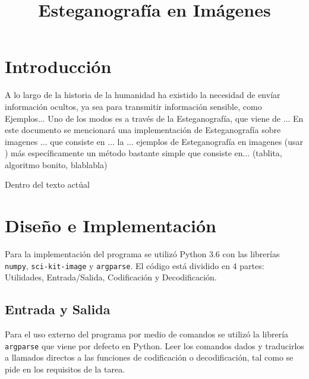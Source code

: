 \documentclass[conference]{IEEEtran}
\begin{document}
\title{Esteganografía en Imágenes}
\author{
}


\maketitle

\begin{abstract}

\end{abstract}

\section*{Introducción} %
    A lo largo de la historia de la humanidad ha existido la necesidad de envíar información ocultos, ya sea para transmitir información sensible, como  Ejemplos...
    Uno de los modos es a través de la Esteganografía, que viene de ...
    En este documento se mencionará una implementación de Esteganografía sobre imagenes ... que consiste en ... la
    ... ejemplos de Esteganografía en imagenes (usar \cite{DIS})
    más específicamente un método bastante simple que consiste en...
    (tablita, algoritmo bonito, blablabla)

    Dentro del texto actúal     
    
\section*{Diseño e Implementación}
	Para la implementación del programa se utilizó Python 3.6 con las librerías \texttt{numpy}, \texttt{sci-kit-image} y \texttt{argparse}. El código está dividido en 4 partes: Utilidades, Entrada/Salida, Codificación y Decodificación.
\subsection*{Entrada y Salida}
    Para el uso externo del programa por medio de comandos se utilizó la librería \texttt{argparse} que viene por defecto en Python. Leer los comandos dados y traducirlos a llamados directos a las funciones de codificación o decodificación, tal como se pide en los requisitos de la tarea.
    	
\end{document}
